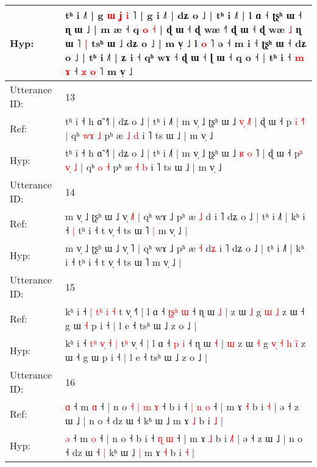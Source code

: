 \documentclass[10pt]{article}
\DeclareRobustCommand{\hl}[1]{{\textcolor{red}{#1}}}
\begin{document}
\begin{longtable}{ll}
 \\
Hyp: & tʰ i ˩˥ | g\hl{ }\hl{ɯ} \hl{ʝ} \hl{i}\hl{ }˥ | g i ˩˥ | dʑ o ˩ | tʰ i ˩˥ | l ɑ ˧ ʈʂʰ ɯ ˧ ɳ ɯ ˩ | m æ ˧ q \hl{}\hl{o} \hl{˧} | ɖ ɯ ˧ ɖ wæ ˧˥\hl{}\hl{} ɖ ɯ ˧ ɖ wæ \hl{˩} ɳ ɯ ˥\hl{ }\hl{|} tsʰ ɯ ˩ dʑ o ˩ | m v̩ ˩ l \hl{o} ˥\hl{}\hl{} ə ˧ m i ˧ ʈʂʰ ɯ ˧ dʑ o ˩ | tʰ i ˩˥ | ʑ i ˧ qʰ wɤ ˧\hl{}\hl{} ɖ ɯ ˧ ɭ ɯ ˧ q o ˧ | tʰ i ˧ \hl{m} \hl{}\hl{ɤ} ˧ \hl{}\hl{z} \hl{o} ˥\hl{}\hl{} m v̩ ˩\hl{}\hl{}
 \\
\midrule
Utterance ID: & 13 \\
Ref: & tʰ i ˧ h ɑ̃ ˧˥ | dʑ o ˩ | tʰ i ˩˥ | m v̩ ˩ ʈʂʰ ɯ ˩ \hl{v}\hl{̩}\hl{ }\hl{˩}˥ | ɖ ɯ ˧ p\hl{} \hl{i}\hl{ }\hl{˧}\hl{˥} | qʰ \hl{w}\hl{ɤ} \hl{˩} pʰ æ \hl{˩} \hl{d} i ˥ ts ɯ ˩ | m v̩ ˩
 \\
Hyp: & tʰ i ˧ h ɑ̃ ˧˥ | dʑ o ˩ | tʰ i ˩˥ | m v̩ ˩ ʈʂʰ ɯ ˩ \hl{ʁ}\hl{ }\hl{o}\hl{ }˥ | ɖ ɯ ˧ p\hl{ʰ} \hl{v}\hl{̩}\hl{ }\hl{˩} | qʰ \hl{}\hl{o} \hl{˧} pʰ æ \hl{˧} \hl{b} i ˥ ts ɯ ˩ | m v̩ ˩
 \\
\midrule
Utterance ID: & 14 \\
Ref: & m v̩ ˩ ʈʂʰ ɯ ˩ v̩ \hl{˩}˥ | qʰ wɤ ˩ pʰ æ \hl{˩} d\hl{} i ˥ dʑ o ˩ | tʰ i ˩˥ | kʰ i ˧\hl{ }\hl{|} tʰ i ˧ t v̩ ˧ ts ɯ ˥\hl{ }\hl{|} m v̩ ˩ |
 \\
Hyp: & m v̩ ˩ ʈʂʰ ɯ ˩ v̩ \hl{}˥ | qʰ wɤ ˩ pʰ æ \hl{˧} d\hl{ʑ} i ˥ dʑ o ˩ | tʰ i ˩˥ | kʰ i ˧\hl{}\hl{} tʰ i ˧ t v̩ ˧ ts ɯ ˥\hl{}\hl{} m v̩ ˩ |
 \\
\midrule
Utterance ID: & 15 \\
Ref: & kʰ i ˧ \hl{}\hl{|} \hl{t}\hl{ʰ} \hl{i} \hl{˧} t\hl{} v̩ ˧\hl{˥} | l ɑ ˧ \hl{ʈ}\hl{ʂ}\hl{ʰ} \hl{ɯ} ˧ ɳ ɯ \hl{˩} |\hl{}\hl{} z ɯ \hl{˩} g\hl{}\hl{}\hl{}\hl{}\hl{} \hl{ɯ} \hl{}\hl{˩} z ɯ ˧ g ɯ\hl{ }\hl{˧} p i ˧ | l e ˧ tsʰ ɯ ˩ z o ˩ |
 \\
Hyp: & kʰ i ˧ \hl{t}\hl{ʰ} \hl{v}\hl{̩} \hl{˧} \hl{|} t\hl{ʰ} v̩ ˧\hl{} | l ɑ ˧ \hl{}\hl{}\hl{p} \hl{i} ˧ ɳ ɯ \hl{˧} |\hl{ }\hl{ɯ} z ɯ \hl{˧} g\hl{ }\hl{v}\hl{̩}\hl{ }\hl{˧} \hl{h} \hl{i}\hl{̃} z ɯ ˧ g ɯ\hl{}\hl{} p i ˧ | l e ˧ tsʰ ɯ ˩ z o ˩ |
 \\
\midrule
Utterance ID: & 16 \\
Ref: & \hl{ɑ} ˧ m \hl{ɑ} ˧ | n o\hl{ }\hl{˧}\hl{ }\hl{|}\hl{ }\hl{m}\hl{ }\hl{ɤ} ˧ b i ˧\hl{ }\hl{|} \hl{n} \hl{o} ˧ | m ɤ \hl{˧} b i \hl{}\hl{˧} | ə ˧ z ɯ ˩ | n o ˧ dz ɯ ˧\hl{}\hl{} kʰ ɯ ˩\hl{}\hl{} m ɤ \hl{˩} b i \hl{˩} |
 \\
Hyp: & \hl{ə} ˧ m \hl{o} ˧ | n o\hl{}\hl{}\hl{}\hl{}\hl{}\hl{}\hl{}\hl{} ˧ b i ˧\hl{}\hl{} \hl{ɳ} \hl{ɯ} ˧ | m ɤ \hl{˩} b i \hl{˩}\hl{˥} | ə ˧ z ɯ ˩ | n o ˧ dz ɯ ˧\hl{ }\hl{|} kʰ ɯ ˩\hl{ }\hl{|} m ɤ \hl{˧} b i \hl{˧} |

\end{longtable}
\end{document}
